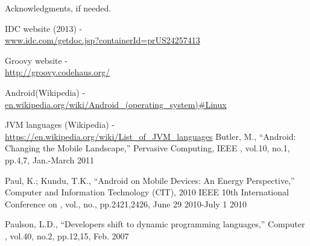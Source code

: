\documentclass{sigplanconf}
\def \ANDROID{\mbox{Android}\xspace}
\def \JVM{JVM\xspace}
\begin{document}
Acknowledgments, if needed.


\makeatletter
  \def\@seccntformat#1{Appendix~\csname the#1\endcsname:\quad}
\makeatother




\begin{thebibliography}{}
  \softraggedright

  IDC website (2013) - \\ \url{www.idc.com/getdoc.jsp?containerId=prUS24257413}

  Groovy website - \\ \url{http://groovy.codehaus.org/}
  
  \ANDROID (Wikipedia) - \\ \url{en.wikipedia.org/wiki/Android\_(operating\_system)#Linux}

  \JVM languages (Wikipedia) - \\ \url{https://en.wikipedia.org/wiki/List\_of\_JVM\_languages}
   Butler, M., ``Android: Changing the Mobile Landscape,'' Pervasive Computing, IEEE , vol.10, no.1, pp.4,7, Jan.-March 2011

  Paul, K.; Kundu, T.K., ``Android on Mobile Devices: An Energy Perspective,'' Computer and Information Technology (CIT), 2010 IEEE 10th International Conference on , vol., no., pp.2421,2426, June 29 2010-July 1 2010

  Paulson, L.D., ``Developers shift to dynamic programming languages,'' Computer , vol.40, no.2, pp.12,15, Feb. 2007


\end{thebibliography}
\end{document}

